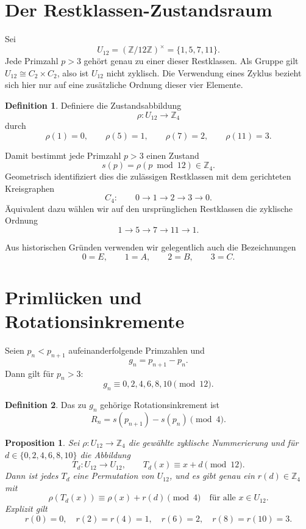 \documentclass[11pt]{article}
\newtheorem{proposition}{Proposition}
\theoremstyle{definition}
\newtheorem{definition}{Definition}
\begin{document}
\section{Der Restklassen-Zustandsraum}

Sei
\[
U_{12}
=
(\mathbb{Z}/12\mathbb{Z})^\times
=
\{1,5,7,11\}.
\]
Jede Primzahl $p>3$ geh\"ort genau zu einer dieser Restklassen.
Als Gruppe gilt $U_{12}\cong C_2\times C_2$, also ist $U_{12}$ nicht zyklisch.
Die Verwendung eines Zyklus bezieht sich hier nur auf eine zus\"atzliche Ordnung dieser vier Elemente.

\begin{definition}
Definiere die Zustandsabbildung
\[
\rho:U_{12}\rightarrow \mathbb{Z}_4
\]
durch
\[
\rho(1)=0,\qquad
\rho(5)=1,\qquad
\rho(7)=2,\qquad
\rho(11)=3.
\]
\end{definition}

Damit bestimmt jede Primzahl $p>3$ einen Zustand
\[
s(p)=\rho(p\bmod 12)\in\mathbb{Z}_4.
\]
Geometrisch identifiziert dies die zul\"assigen Restklassen mit dem gerichteten Kreisgraphen
\[
C_4:\qquad 0\rightarrow1\rightarrow2\rightarrow3\rightarrow0.
\]
\"Aquivalent dazu w\"ahlen wir auf den urspr\"unglichen Restklassen die zyklische Ordnung
\[
1\to5\to7\to11\to1.
\]

Aus historischen Gr\"unden verwenden wir gelegentlich auch die Bezeichnungen
\[
0=E,\qquad 1=A,\qquad 2=B,\qquad 3=C.
\]

\section{Priml\"ucken und Rotationsinkremente}

Seien $p_n<p_{n+1}$ aufeinanderfolgende Primzahlen und
\[
g_n=p_{n+1}-p_n.
\]
Dann gilt f\"ur $p_n>3$:
\[
g_n\equiv 0,2,4,6,8,10 \pmod{12}.
\]

\begin{definition}
Das zu $g_n$ geh\"orige Rotationsinkrement ist
\[
R_n=s(p_{n+1})-s(p_n)\pmod 4.
\]
\end{definition}

\begin{proposition}
Sei $\rho:U_{12}\to\mathbb{Z}_4$ die gew\"ahlte zyklische Nummerierung und
f\"ur $d\in\{0,2,4,6,8,10\}$ die Abbildung
\[
T_d:U_{12}\to U_{12},\qquad T_d(x)\equiv x+d\pmod{12}.
\]
Dann ist jedes $T_d$ eine Permutation von $U_{12}$, und es gibt genau ein $r(d)\in\mathbb{Z}_4$ mit
\[
\rho(T_d(x))\equiv \rho(x)+r(d)\pmod 4
\quad\text{f\"ur alle }x\in U_{12}.
\]
Explizit gilt
\[
r(0)=0,\quad r(2)=r(4)=1,\quad r(6)=2,\quad r(8)=r(10)=3.
\]
\end{proposition}
\end{document}
